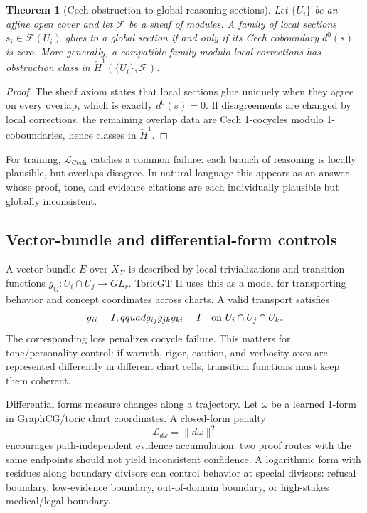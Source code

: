 \documentclass[10pt]{article}
\newtheorem{theorem}{Theorem}[section]
\newcommand{\calF}{\mathcal{F}}
\newcommand{\loss}{\mathcal{L}}
\numberwithin{equation}{section}
\begin{document}
\begin{theorem}[Cech obstruction to global reasoning sections]
Let $\{U_i\}$ be an affine open cover and let $\calF$ be a sheaf of modules. A family of local sections $s_i\in\calF(U_i)$ glues to a global section if and only if its Cech coboundary $d^0(s)$ is zero. More generally, a compatible family modulo local corrections has obstruction class in $\check H^1(\{U_i\},\calF)$.
\end{theorem}
\begin{proof}
The sheaf axiom states that local sections glue uniquely when they agree on every overlap, which is exactly $d^0(s)=0$. If disagreements are changed by local corrections, the remaining overlap data are Cech 1-cocycles modulo 1-coboundaries, hence classes in $\check H^1$.
\end{proof}

For training, $\loss_{\mathrm{Cech}}$ catches a common failure: each branch of reasoning is locally plausible, but overlaps disagree. In natural language this appears as an answer whose proof, tone, and evidence citations are each individually plausible but globally inconsistent.

\subsection{Vector-bundle and differential-form controls}
A vector bundle $E$ over $X_\Sigma$ is described by local trivializations and transition functions $g_{ij}:U_i\cap U_j\to GL_r$. ToricGT II uses this as a model for transporting behavior and concept coordinates across charts. A valid transport satisfies
\begin{equation}
g_{ii}=I,\\qquad g_{ij}g_{jk}g_{ki}=I\quad\text{on }U_i\cap U_j\cap U_k.
\end{equation}
The corresponding loss penalizes cocycle failure. This matters for tone/personality control: if warmth, rigor, caution, and verbosity axes are represented differently in different chart cells, transition functions must keep them coherent.

Differential forms measure changes along a trajectory. Let $\omega$ be a learned 1-form in GraphCG/toric chart coordinates. A closed-form penalty
\begin{equation}
\loss_{d\omega}=\|d\omega\|^2
\end{equation}
encourages path-independent evidence accumulation: two proof routes with the same endpoints should not yield inconsistent confidence. A logarithmic form with residues along boundary divisors can control behavior at special divisors: refusal boundary, low-evidence boundary, out-of-domain boundary, or high-stakes medical/legal boundary.
\end{document}
